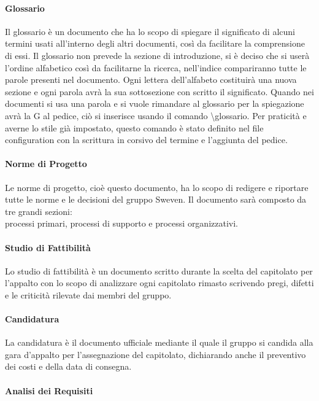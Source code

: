 \paragraph{Glossario}
Il glossario è un documento che ha lo scopo di spiegare il significato di alcuni termini usati 
all'interno degli altri documenti, così da facilitare la comprensione di essi. \newline
Il glossario non prevede la sezione di introduzione, si è deciso che si userà l'ordine alfabetico 
così da facilitarne la ricerca, nell'indice compariranno tutte le parole presenti nel documento. 
Ogni lettera dell'alfabeto costituirà una nuova sezione e ogni parola avrà la sua sottosezione 
con scritto il significato. \newline
Quando nei documenti si usa una parola e si vuole rimandare al glossario per la spiegazione 
avrà la G al pedice, ciò si inserisce usando il comando \textbackslash glossario. 
Per praticità e averne lo stile già impostato, questo comando è stato definito nel file 
configuration con la scrittura in corsivo del termine e l'aggiunta del pedice.

\paragraph{Norme di Progetto}
Le norme di progetto, cioè questo documento, ha lo scopo di redigere e riportare tutte le norme 
e le decisioni del gruppo Sweven. Il documento sarà composto da tre grandi sezioni: \\
processi primari, processi di supporto e processi organizzativi.

\paragraph{Studio di Fattibilità}
Lo studio di fattibilità è un documento scritto durante la scelta del capitolato per l'appalto con 
lo scopo di analizzare ogni capitolato rimasto scrivendo pregi, difetti e le criticità rilevate dai 
membri del gruppo.

\paragraph{Candidatura}
La candidatura è il documento ufficiale mediante il quale il gruppo si candida alla gara d'appalto 
per l'assegnazione del capitolato, dichiarando anche il preventivo dei costi e della data di consegna.

\paragraph{Analisi dei Requisiti}

